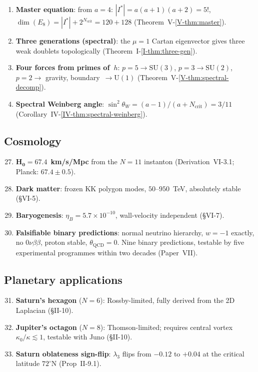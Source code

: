 \begin{enumerate}
\item \textbf{Master equation}: from $a = 4$:
  $|I^*| = a(a{+}1)(a{+}2) = 5!$,
  $\dim(E_8) = |I^*| + 2^{N_{\mathrm{crit}}} = 120 + 128$
  (Theorem~V-\ref{V-thm:master}).

\item \textbf{Three generations (spectral)}: the $\mu{=}1$
  Cartan eigenvector gives three weak doublets topologically
  (Theorem~I-\ref{I-thm:three-gen}).

\item \textbf{Four forces from primes of~$h$}:
  $p{=}5 \to \mathrm{SU}(3)$, $p{=}3 \to \mathrm{SU}(2)$,
  $p{=}2 \to$ gravity, boundary~$\to \mathrm{U}(1)$
  (Theorem~V-\ref{V-thm:spectral-decomp}).

\item \textbf{Spectral Weinberg angle}:
  $\sin^2\theta_W = (a{-}1)/(a{+}N_{\mathrm{crit}}) = 3/11$
  (Corollary~IV-\ref{IV-thm:spectral-weinberg}).
\end{enumerate}

\subsection{Cosmology}

\begin{enumerate}\setcounter{enumi}{26}
\item $\mathbf{H_0 = 67.4}$~\textbf{km/s/Mpc} from the
  $N = 11$ instanton (Derivation~VI-3.1;
  Planck: $67.4 \pm 0.5$).

\item \textbf{Dark matter}: frozen KK polygon modes,
  $50$--$950$~TeV, absolutely stable (\S VI-5).

\item \textbf{Baryogenesis}:
  $\eta_B = 5.7 \times 10^{-10}$, wall-velocity
  independent (\S VI-7).

\item \textbf{Falsifiable binary predictions}:
  normal neutrino hierarchy, $w = -1$ exactly,
  no $0\nu\beta\beta$, proton stable,
  $\theta_{\mathrm{QCD}} = 0$.
  Nine binary predictions, testable by five experimental
  programmes within two decades (Paper~VII).
\end{enumerate}

\subsection{Planetary applications}

\begin{enumerate}\setcounter{enumi}{30}
\item \textbf{Saturn's hexagon} ($N = 6$):
  Rossby-limited, fully derived from the 2D Laplacian (\S II-10).

\item \textbf{Jupiter's octagon} ($N = 8$):
  Thomson-limited; requires central vortex
  $\kappa_0/\kappa \lesssim 1$, testable with Juno (\S II-10).

\item \textbf{Saturn oblateness sign-flip}:
  $\lambda_3$ flips from $-0.12$ to $+0.04$ at the
  critical latitude $72^\circ$N (Prop~II-9.1).
\end{enumerate}


